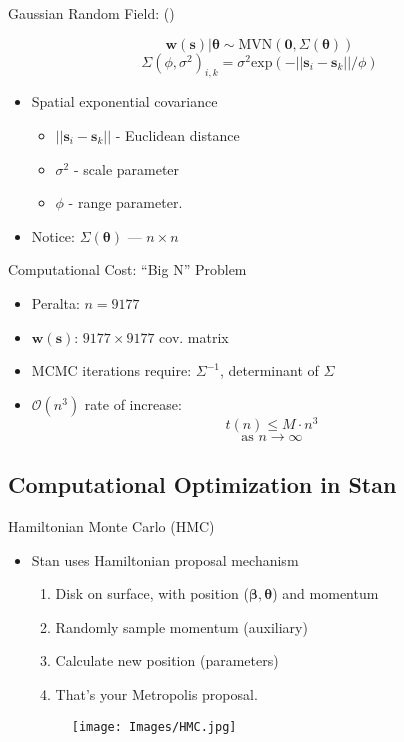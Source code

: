 \documentclass{beamer}
\begin{document}
\begin{frame}{Gaussian Random Field: ()}{} %

$$\pmb{w}(\pmb{s}) | \pmb{\theta} \sim \text{MVN}(\pmb{0}, \Sigma(\pmb{\theta}))$$
$$\Sigma(\phi, \sigma^{2})_{i,k} = \sigma^{2} \text{exp}(-||\pmb{s}_{i} - \pmb{s}_{k}||/\phi)$$
\begin{itemize}
\addtolength{\itemsep}{0.5\baselineskip}
\item Spatial exponential covariance
  \begin{itemize}
  \addtolength{\itemsep}{0.5\baselineskip}
  \item $||\pmb{s}_{i} - \pmb{s}_{k}||$ - Euclidean distance
  \item $\sigma^{2}$ - scale parameter
  \item $\phi$ - range parameter.
  \end{itemize}
\item Notice: $\Sigma(\pmb{\theta})$ --- $n \times n$
\end{itemize}

\end{frame}


\begin{frame}{Computational Cost: ``Big N'' Problem}{}
\begin{itemize}
\addtolength{\itemsep}{0.5\baselineskip}
\item Peralta: $n = 9177$
\item $\pmb{w}(\pmb{s})$: $9177 \times 9177$ cov. matrix
\item MCMC iterations require: $\Sigma^{-1}$, determinant of $\Sigma$
\item $\mathcal{O}(n^{3})$ rate of increase: 
$$t(n) \leq M \cdot n^{3}$$ 
$$ \text{as } n \rightarrow \infty$$
\end{itemize}
\end{frame}

\subsection{Computational Optimization in Stan}

\begin{frame}{Hamiltonian Monte Carlo (HMC)}
\begin{itemize}
\addtolength{\itemsep}{0.5\baselineskip}
\item Stan uses Hamiltonian proposal mechanism
\begin{enumerate}
\addtolength{\itemsep}{0.5\baselineskip}
\item Disk on surface, with position ($\pmb{\beta}, \pmb{\theta}$) and momentum
\item Randomly sample momentum (auxiliary)
\item Calculate new position (parameters) 
\item That's your Metropolis proposal.
\end{enumerate}
        \begin{figure}[H]
      	\centering
      	\texttt{[image: Images/HMC.jpg]}
      	\end{figure}
\end{itemize}
\end{frame}
\end{document}
